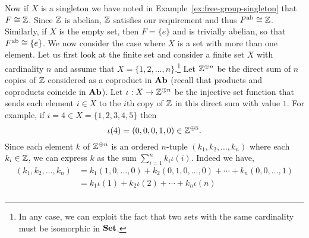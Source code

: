 Now if \(X\) is a singleton we have noted in
Example~\ref{ex:free-group-singleton} that \(F \cong \mathbb{Z}\). Since \(\mathbb{Z}\) is
abelian, \(\mathbb{Z}\) satisfies our requirement and thus \(F^{\mathrm{ab}} \cong \mathbb{Z}\).
Similarly, if \(X\) is the empty set, then \(F = \{e\}\) and is trivially
abelian, so that \(F^{\mathrm{ab}} \cong \{e\}\). We now consider the case where \(X\) is
a set with more than one element. Let us first look at the finite set and
consider a finite set \(X\) with cardinality \(n\) and assume that \(X = \{1, 2,
\ldots, n\}\).\footnote{In any case, we can exploit the fact that two sets with
the same cardinality must be isomorphic in \(\mathbf{Set}\).} Let \(\mathbb{Z}^{\oplus n}\) be
the direct sum of \(n\) copies of \(\mathbb{Z}\) considered as a coproduct in \(\mathbf{Ab}\)
(recall that products and coproducts coincide in \(\mathbf{Ab}\)). Let \(\iota : X \to
\mathbb{Z}^{\oplus n}\) be the injective set function that sends each element \(i \in
X\) to the \(i\)th copy of \(\mathbb{Z}\) in this direct sum with value \(1\). For
example, if \(i = 4 \in X = \{1, 2, 3, 4, 5\}\) then
\[
    \iota(4) = (0, 0, 0, 1, 0) \in \mathbb{Z}^{\oplus 5}.
\]
Since each element \(k\) of \(\mathbb{Z}^{\oplus n}\) is an ordered \(n\)-tuple \((k_1,
k_2, \ldots, k_n)\) where each \(k_i \in \mathbb{Z}\), we can express \(k\) as the sum
\(\sum_{i = 1}^n k_i \iota(i)\). Indeed we have,
\begin{align*}
    (k_1, k_2, \ldots, k_n) & = k_1(1, 0, \ldots, 0) + k_2(0, 1, 0, \ldots, 0) + \cdots + k_n(0, 0, \ldots, 1) \\
                            & = k_1\iota(1) + k_2\iota(2) + \cdots + k_n\iota(n)\\
\end{align*}

